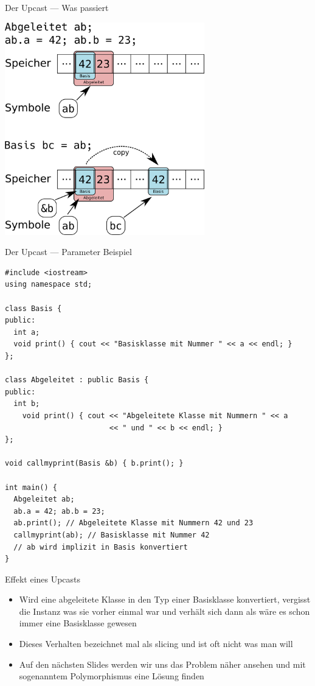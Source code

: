 \documentclass[presentation]{beamer}
\begin{document}
\begin{frame}[label={sec:org5815da8}]{Der Upcast --- Was passiert}
\begin{center}\begin{center}
\includegraphics[width=0.65\textwidth]{img/upcast.png}
\end{center}\end{center}
\end{frame}
\begin{frame}[fragile,label={sec:org99e85b3}]{Der Upcast --- Parameter Beispiel}
 \begin{verbatim}
#include <iostream>
using namespace std;

class Basis {
public:
  int a;
  void print() { cout << "Basisklasse mit Nummer " << a << endl; }
};

class Abgeleitet : public Basis {
public:
  int b;
    void print() { cout << "Abgeleitete Klasse mit Nummern " << a
                        << " und " << b << endl; }
};

void callmyprint(Basis &b) { b.print(); }

int main() {
  Abgeleitet ab;
  ab.a = 42; ab.b = 23;
  ab.print(); // Abgeleitete Klasse mit Nummern 42 und 23
  callmyprint(ab); // Basisklasse mit Nummer 42
  // ab wird implizit in Basis konvertiert
}
\end{verbatim}
\end{frame}
\begin{frame}[label={sec:orgac2309d}]{Effekt eines Upcasts}
\begin{itemize}
\item Wird eine abgeleitete Klasse in den Typ einer Basisklasse
konvertiert, vergisst die Instanz was sie vorher einmal war und
verhält sich dann als wäre es schon immer eine Basisklasse gewesen
\item Dieses Verhalten bezeichnet mal als \alert{slicing} und ist oft nicht was
man will
\item Auf den nächsten Slides werden wir uns das Problem näher ansehen und
mit sogenanntem \alert{Polymorphismus} eine Lösung finden
\end{itemize}
\end{frame}
\end{document}
